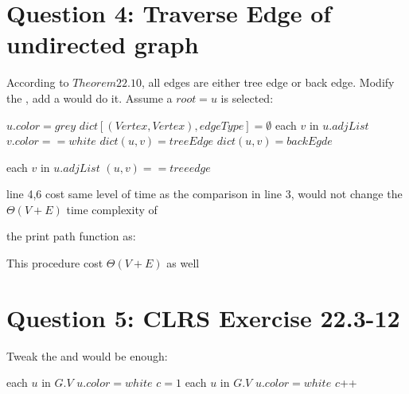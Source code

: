 \documentclass[]{article}
\begin{document}
\section{Question 4: Traverse Edge of undirected graph}
According to $Theorem 22.10$, all edges are either tree edge or back edge. Modify the , add a  would do it. Assume a $root = u$ is selected:

\begin{codebox}
	
	\li $u.color = grey$
	\li $dict[(Vertex,Vertex), edgeType] = \emptyset$
	\li	\For each $v$ in $u.adjList$
	\li \Do \If $v.color == white$
	\li 	\Then $dict(u,v) = treeEdge$
	\li 		  {}
	\li 	\Else $dict(u,v) = backEgde$
	\End
	\End
	\li {}
	
\end{codebox}

\begin{codebox}
	
	\li {}
	\li	\For each $v$ in $u.adjList$
	\li \Do \If $(u,v) == treeedge$
	\li 	\Then {}
	\li     {}
	\li 	\Else {}
	\End
	\End
	
\end{codebox}

line 4,6 cost same level of time as the comparison in line 3, would not change the $\Theta(V+E)$ time complexity of 

the print path function as:

This procedure cost $\Theta(V+E)$ as well

\section{Question 5: CLRS Exercise 22.3-12}

Tweak the  and  would be enough:

\begin{codebox}
	
	\li	\For each $u$ in $G.V$
	\li \Do $u.color = white$
	\End
	\li $c=1$
	\li	\For each $u$ in $G.V$
	\li \Do \If $u.color = white$
	\li \Then {}
	\li $c$++
	\End
	\End
	
\end{codebox}
\end{document}

